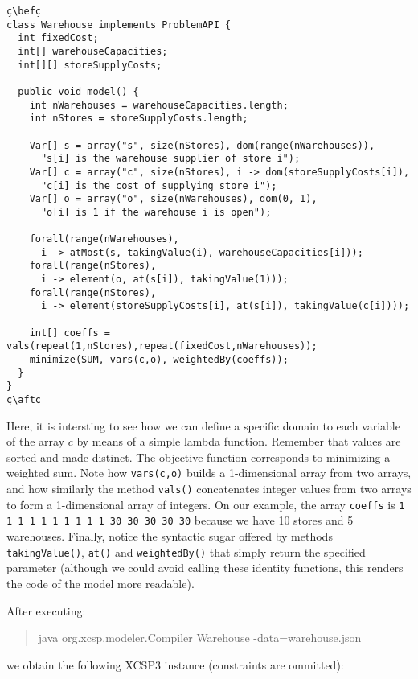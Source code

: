 \documentclass[10pt]{article}
\def\xt{{\rm XCSP3}\xspace}
\newcommand{\nn}[1]{{\tt #1}} %
\def\xt{{\rm XCSP3}\xspace}
\newenvironment{myvb}{\endgraf\small\verbatim}{\endverbatim}
\def\bef{\rule{10cm}{0.1mm}} %
\def\aft{\rule{10cm}{0.1mm}\medskip}
\begin{document}
\begin{lstlisting}
ç\befç
class Warehouse implements ProblemAPI {
  int fixedCost;
  int[] warehouseCapacities;
  int[][] storeSupplyCosts;
  
  public void model() {
    int nWarehouses = warehouseCapacities.length;
    int nStores = storeSupplyCosts.length;
    
    Var[] s = array("s", size(nStores), dom(range(nWarehouses)),
      "s[i] is the warehouse supplier of store i");
    Var[] c = array("c", size(nStores), i -> dom(storeSupplyCosts[i]),
      "c[i] is the cost of supplying store i");
    Var[] o = array("o", size(nWarehouses), dom(0, 1),
      "o[i] is 1 if the warehouse i is open");
    
    forall(range(nWarehouses),
      i -> atMost(s, takingValue(i), warehouseCapacities[i]));
    forall(range(nStores),
      i -> element(o, at(s[i]), takingValue(1)));
    forall(range(nStores),
      i -> element(storeSupplyCosts[i], at(s[i]), takingValue(c[i])));

    int[] coeffs = vals(repeat(1,nStores),repeat(fixedCost,nWarehouses));
    minimize(SUM, vars(c,o), weightedBy(coeffs)); 
  }
}
ç\aftç
\end{lstlisting}

Here, it is intersting to see how we can define a specific domain to each variable of the array $c$ by means of a simple lambda function.
Remember that values are sorted and made distinct. 
The objective function corresponds to minimizing a weighted sum.
Note how \verb!vars(c,o)! builds a 1-dimensional array from two arrays, and how similarly the method \nn{vals()} concatenates integer values from two arrays to form a 1-dimensional array of integers.
On our example, the array \texttt{coeffs} is \verb!1 1 1 1 1 1 1 1 1 1 30 30 30 30 30! because we have 10 stores and 5 warehouses.
Finally, notice the syntactic sugar offered by methods \nn{takingValue()}, \nn{at()} and \nn{weightedBy()} that simply return the specified parameter (although we could avoid calling these identity functions, this renders the code of the model more readable). 

After executing:
\begin{quote}
\begin{myvb}
java org.xcsp.modeler.Compiler Warehouse -data=warehouse.json
\end{myvb}
\end{quote}
we obtain the following \xt instance (constraints are ommitted):
\end{document}
